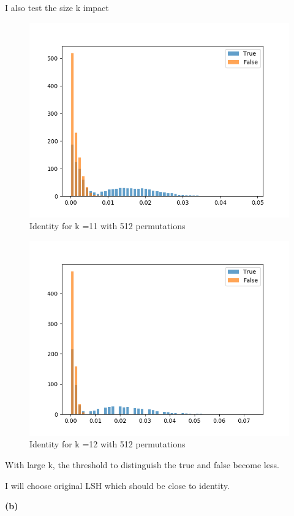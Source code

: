 \documentclass[11pt]{article}
\renewcommand\part[1]{\vspace{.10in}\textbf{(#1)}}
\begin{document}
I also test the size k impact
\begin{figure}[H]
	\centering
	\includegraphics[width = .8\textwidth]{Ecoli_30x_overlap_5000_1000_cutoff_jaccard_k_11_perm_512.png}
	\caption{Identity for k =11 with 512 permutations}
	\label{fig1}
\end{figure}

\begin{figure}[H]
	\centering
	\includegraphics[width = .8\textwidth]{Ecoli_30x_overlap_5000_1000_cutoff_identity_k_12_perm_512.png}
	\caption{Identity for k =12 with 512 permutations}
	\label{fig1}

\end{figure}

With large k, the threshold to distinguish the true and false become less.

I will choose original LSH which should be close to identity.

\part{b}
\end{document}
